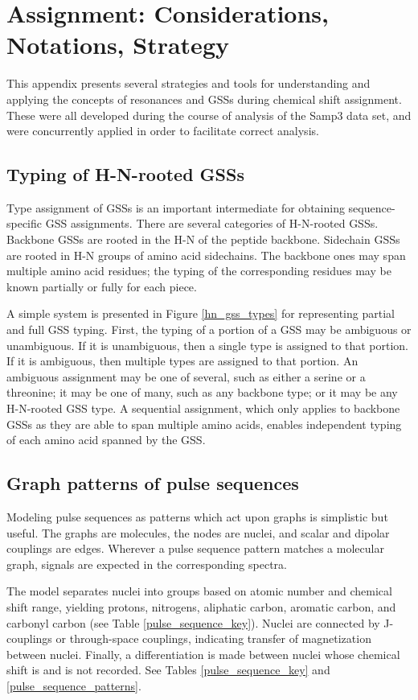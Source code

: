 \chapter{Assignment: Considerations, Notations, Strategy}
This appendix presents several strategies and tools for understanding and 
applying the concepts of resonances and GSSs during chemical shift assignment.
These were all developed during the course of analysis of the Samp3 data set,
and were concurrently applied in order to facilitate correct analysis.


\section{Typing of H-N-rooted GSSs}
Type assignment of GSSs is an important intermediate for obtaining 
sequence-specific GSS assignments.  There are several categories of H-N-rooted
GSSs.  Backbone GSSs are rooted in the H-N of the peptide backbone.  Sidechain 
GSSs are rooted in H-N groups of amino acid sidechains.
The backbone ones may span multiple amino acid residues; the typing of the 
corresponding residues may be known partially or fully for each piece.

A simple system is presented in Figure \ref{hn_gss_types} for representing 
partial and full GSS typing.  First, the typing of a portion of a GSS may be 
ambiguous or unambiguous.  If it is unambiguous, then a single type is assigned
to that portion.  If it is ambiguous, then multiple types are assigned to that
portion.  An ambiguous assignment may be one of several, such as either a
serine or a threonine; it may be one of many, such as any backbone type; or
it may be any H-N-rooted GSS type.  A sequential assignment, which only applies
to backbone GSSs as they are able to span multiple amino acids, enables 
independent typing of each amino acid spanned by the GSS.


\section{Graph patterns of pulse sequences}
Modeling pulse sequences as patterns which act upon graphs is simplistic but
useful.  The graphs are molecules, the nodes are nuclei, and scalar and
dipolar couplings are edges.  Wherever a pulse sequence pattern matches 
a molecular graph, signals are expected in the corresponding spectra.

The model separates nuclei into groups based on atomic number
and chemical shift range, yielding protons, nitrogens, aliphatic carbon,
aromatic carbon, and carbonyl carbon (see Table \ref{pulse_sequence_key}).
Nuclei are connected by J-couplings or through-space couplings, 
indicating transfer of magnetization between nuclei.
Finally, a differentiation is made between nuclei whose chemical shift is 
and is not recorded.  See Tables \ref{pulse_sequence_key} and 
\ref{pulse_sequence_patterns}.


